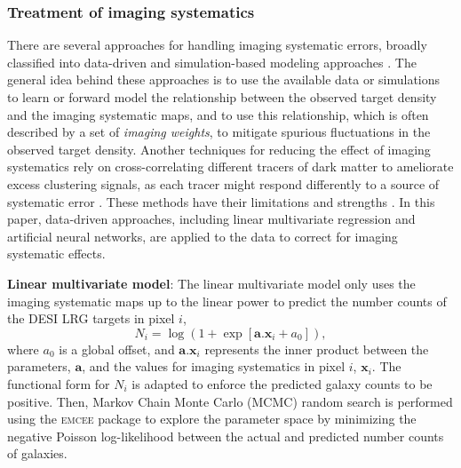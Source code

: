 \subsubsection{Treatment of imaging systematics}
There are several approaches for handling imaging systematic errors, broadly classified into data-driven and simulation-based modeling approaches \citep[see e.g.][]{ross2011, ashley2012MNRAS,Ross17,2012ApJ...761...14H,suchyta2016,delubac2016sdss, prakash2016sdss, Raichoor2017MNRAS.471.3955R, laurent2017clustering, Elvin18, 2018ApJ...863..110B, 2020MNRAS.495.1613R, kong2020,Everett_2022, chaussidon2022angular,Eggert_2023}. The general idea behind these approaches is to use the available data or simulations to learn or forward model the relationship between the observed target density and the imaging systematic maps, and to use this relationship, which is often described by a set of \textit{imaging weights}, to mitigate spurious fluctuations in the observed target density. Another techniques for reducing the effect of imaging systematics rely on cross-correlating different tracers of dark matter to ameliorate excess clustering signals, as each tracer might respond differently to a source of systematic error \citep[see, e.g.,][]{giannantonio2014improved}. These methods have their limitations and strengths \citep[see, e.g.,][for a review]{2021MNRAS.503.5061W}. In this paper, data-driven approaches, including linear multivariate regression and artificial neural networks, are applied to the data to correct for imaging systematic effects.

\textbf{Linear multivariate model}: The linear multivariate model only uses the imaging systematic maps up to the linear power to predict the number counts of the DESI LRG targets in pixel $i$,
\begin{equation}\label{eq:npred}
    N_{i} = \log ( 1 + \exp[\textbf{a}.\textbf{x}_{i}+a_{0}]),
\end{equation}
where $a_{0}$ is a global offset, and $\textbf{a}.\textbf{x}_{i}$ represents the inner product between the parameters, $\textbf{a}$, and the values for imaging systematics in pixel $i$, $\textbf{x}_{i}$. The functional form for $N_{i}$ is adapted to enforce the predicted galaxy counts to be positive. Then, Markov Chain Monte Carlo (MCMC) random search is performed using the \textsc{emcee} package \citep{2013PASP..125..306F} to explore the parameter space by minimizing the negative Poisson log-likelihood between the actual and predicted number counts of galaxies.

